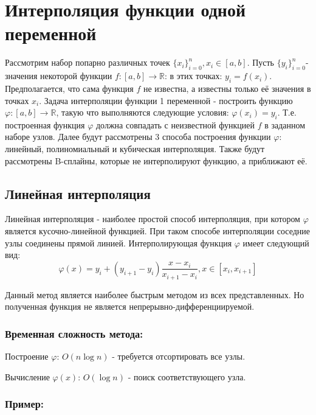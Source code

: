 \section{Интерполяция функции одной переменной}

Рассмотрим набор попарно различных точек $\{x_i\}_{i=0}^n, x_i \in [a, b]$. Пусть $\{y_i\}_{i=0}^n$- значения некоторой функции $f \colon [a,b] \to \mathbb{R}$: в этих точках: $y_i = f(x_i)$. Предполагается, что сама функция $f$ не известна, а известны только её значения в точках $x_i$. Задача интерполяции функции 1 переменной - построить функцию $\varphi \colon [a, b] \to \mathbb{R}$, такую что выполняются следующие условия: $\varphi(x_i) = y_i$. Т.е. построенная функция $\varphi$ должна совпадать с неизвестной функцией $f$ в заданном наборе узлов. Далее будут рассмотрены 3 способа построения функции $\varphi$: линейный, полиномиальный и кубическая интерполяция. Также будут рассмотрены B-сплайны, которые не интерполируют функцию, а приближают её.

\subsection{Линейная интерполяция}

Линейная интерполяция - наиболее простой способ интерполяция, при котором $\varphi$ является кусочно-линейной функцией. При таком способе интерполяции соседние узлы соединены прямой линией. Интерполирующая функция $\varphi$ имеет следующий вид:
\begin{equation}
  \varphi(x) = y_i + (y_{i+1} - y_i) \frac{x-x_i}{x_{i+1} - x_i}, x\in [x_i, x_{i+1}]
\end{equation}

Данный метод является наиболее быстрым методом из всех представленных. Но полученная функция не является непрерывно-дифференциируемой.

\subsubsection{Временная сложность метода:}

Построение $\varphi$: $ O(n \log n)$ - требуется отсортировать все узлы.

Вычисление $\varphi(x)$: $O(\log n)$ - поиск соответствующего узла.

\subsubsection{Пример:}

